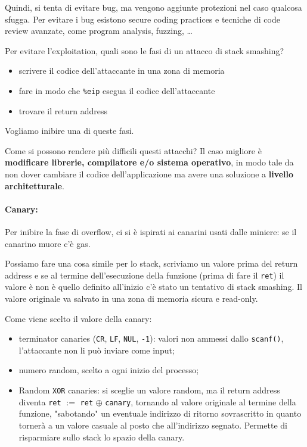 Quindi, si tenta di evitare bug, ma vengono aggiunte protezioni nel caso qualcosa sfugga. Per evitare i bug esistono secure coding practices e tecniche di code review avanzate, come program analysis, fuzzing, \dots

Per evitare l'exploitation, quali sono le fasi di un attacco di stack smashing?
\begin{itemize}
	\item scrivere il codice dell'attaccante in una zona di memoria
	
    \item fare in modo che \texttt{\%eip} esegua il codice dell'attaccante
	
    \item trovare il return address
\end{itemize}
Vogliamo inibire una di queste fasi.

Come si possono rendere più difficili questi attacchi? Il caso migliore è \textbf{modificare librerie, compilatore e/o sistema operativo}, in modo tale da non dover cambiare il codice dell'applicazione ma avere una soluzione a \textbf{livello architetturale}.

\paragraph{Canary:} Per inibire la fase di overflow, ci si è ispirati ai canarini usati dalle miniere: se il canarino muore c'è gas. 

Possiamo fare una cosa simile per lo stack, scriviamo un valore prima del return address e se al termine dell'esecuzione della funzione (prima di fare il \texttt{ret}) il valore è non è quello definito all'inizio c'è stato un tentativo di stack smashing. Il valore originale va salvato in una zona di memoria sicura e read-only.

Come viene scelto il valore della canary: 
\begin{itemize}
	\item terminator canaries (\texttt{CR}, \texttt{LF}, \texttt{NUL}, \texttt{-1}): valori non ammessi dallo \texttt{scanf()}, l'attaccante non li può inviare come input;
	
    \item numero random, scelto a ogni inizio del processo;
	
    \item Random \texttt{XOR} canaries: si sceglie un valore random, ma il return address diventa \texttt{ret} $:=$ \texttt{ret} $\oplus$ \texttt{canary}, tornando al valore originale al termine della funzione, "sabotando" un eventuale indirizzo di ritorno sovrascritto in quanto tornerà a un valore casuale al posto che all'indirizzo segnato. Permette di risparmiare sullo stack lo spazio della canary.
\end{itemize}

